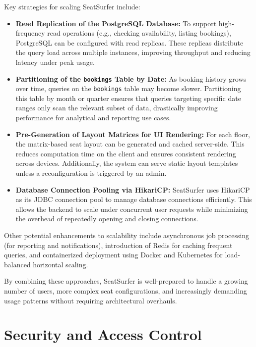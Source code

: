 \documentclass[12pt,a4paper]{report} %
\begin{document}
Key strategies for scaling SeatSurfer include:

\begin{itemize}
    \item \textbf{Read Replication of the PostgreSQL Database:} To support high-frequency read operations (e.g., checking availability, listing bookings), PostgreSQL can be configured with read replicas. These replicas distribute the query load across multiple instances, improving throughput and reducing latency under peak usage.

    \item \textbf{Partitioning of the \texttt{bookings} Table by Date:} As booking history grows over time, queries on the \texttt{bookings} table may become slower. Partitioning this table by month or quarter ensures that queries targeting specific date ranges only scan the relevant subset of data, drastically improving performance for analytical and reporting use cases.

    \item \textbf{Pre-Generation of Layout Matrices for UI Rendering:} For each floor, the matrix-based seat layout can be generated and cached server-side. This reduces computation time on the client and ensures consistent rendering across devices. Additionally, the system can serve static layout templates unless a reconfiguration is triggered by an admin.

    \item \textbf{Database Connection Pooling via HikariCP:} SeatSurfer uses HikariCP as its JDBC connection pool to manage database connections efficiently. This allows the backend to scale under concurrent user requests while minimizing the overhead of repeatedly opening and closing connections.
\end{itemize}

Other potential enhancements to scalability include asynchronous job processing (for reporting and notifications), introduction of Redis for caching frequent queries, and containerized deployment using Docker and Kubernetes for load-balanced horizontal scaling.

By combining these approaches, SeatSurfer is well-prepared to handle a growing number of users, more complex seat configurations, and increasingly demanding usage patterns without requiring architectural overhauls.

\newpage

\section{Security and Access Control}
\end{document}
